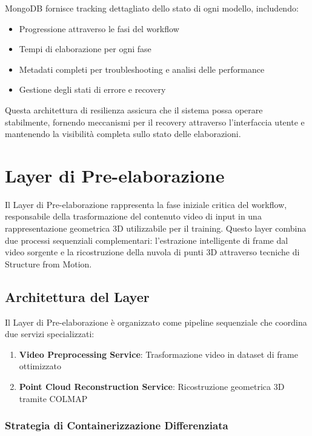 MongoDB fornisce tracking dettagliato dello stato di ogni modello, includendo:

\begin{itemize}
	\item Progressione attraverso le fasi del workflow
	\item Tempi di elaborazione per ogni fase
	\item Metadati completi per troubleshooting e analisi delle performance
	\item Gestione degli stati di errore e recovery
\end{itemize}

Questa architettura di resilienza assicura che il sistema possa operare stabilmente, fornendo meccanismi per il recovery attraverso l'interfaccia utente e mantenendo la visibilità completa sullo stato delle elaborazioni.



\section{Layer di Pre-elaborazione}

Il Layer di Pre-elaborazione rappresenta la fase iniziale critica del workflow, responsabile della trasformazione del contenuto video di input in una rappresentazione geometrica 3D utilizzabile per il training. Questo layer combina due processi sequenziali complementari: l'estrazione intelligente di frame dal video sorgente e la ricostruzione della nuvola di punti 3D attraverso tecniche di Structure from Motion.

\subsection{Architettura del Layer}

Il Layer di Pre-elaborazione è organizzato come pipeline sequenziale che coordina due servizi specializzati:

\begin{enumerate}
	\item \textbf{Video Preprocessing Service}: Trasformazione video in dataset di frame ottimizzato
	\item \textbf{Point Cloud Reconstruction Service}: Ricostruzione geometrica 3D tramite COLMAP
\end{enumerate}

\subsubsection{Strategia di Containerizzazione Differenziata}

